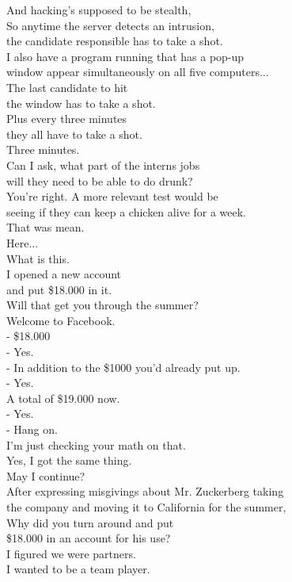 \documentclass{article}
\begin{document}
\begin{multicols}{3}
And hacking's supposed to be stealth,\\
So anytime the server detects an intrusion,\\
the candidate responsible has to take a shot.\\
I also have a program running that has a pop-up\\
window appear simultaneously on all five computers...\\
The last candidate to hit\\
the window has to take a shot.\\
Plus every three minutes\\
they all have to take a shot.\\
Three minutes.\\
Can I ask, what part of the interns jobs\\
will they need to be able to do drunk?\\
You're right. A more relevant test would be\\
seeing if they can keep a chicken alive for a week.\\
That was mean.\\
Here...\\
What is this.\\
I opened a new account\\
and put \$18.000 in it.\\
Will that get you through the summer?\\
Welcome to Facebook.\\
- \$18.000\\
- Yes.\\
- In addition to the \$1000 you'd already put up.\\
- Yes.\\
A total of \$19.000 now.\\
- Yes.\\
- Hang on.\\
I'm just checking your math on that.\\
Yes, I got the same thing.\\
May I continue?\\
After expressing misgivings about Mr. Zuckerberg taking\\
the company and moving it to California for the summer,\\
Why did you turn around and put\\
\$18.000 in an account for his use?\\
I figured we were partners.\\
I wanted to be a team player.\\

\end{multicols}
\end{document}
